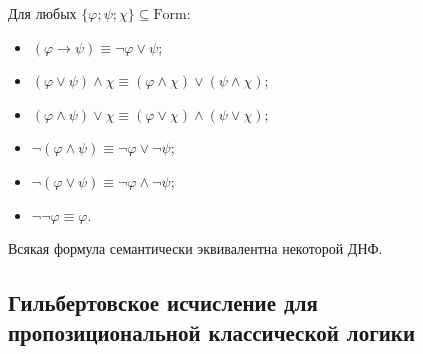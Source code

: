 \documentclass[12pt,a4paper]{article}
\newcommand{\Formul}{\ensuremath{\mathrm{Form}}\xspace}
\begin{document}
    \begin{example}
        Для любых $\{\varphi; \psi; \chi\} \subseteq \Formul$:
        \begin{itemize}
            \item $(\varphi \rightarrow \psi) \equiv \neg \varphi \vee \psi$;
            \item $(\varphi \vee \psi) \wedge \chi \equiv (\varphi \wedge \chi) \vee (\psi \wedge \chi)$;
            \item $(\varphi \wedge \psi) \vee \chi \equiv (\varphi \vee \chi) \wedge (\psi \vee \chi)$;
            \item $\neg (\varphi \wedge \psi) \equiv \neg \varphi \vee \neg \psi$;
            \item $\neg (\varphi \vee \psi) \equiv \neg \varphi \wedge \neg \psi$;
            \item $\neg \neg \varphi \equiv \varphi$.
        \end{itemize}
    \end{example}

    \begin{exercise}
        Всякая формула семантически эквивалентна некоторой ДНФ.
    \end{exercise}

    \subsection{Гильбертовское исчисление для пропозициональной классической логики}
\end{document}
